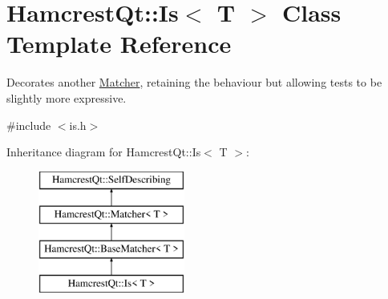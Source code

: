 \hypertarget{class_hamcrest_qt_1_1_is}{\section{Hamcrest\-Qt\-:\-:Is$<$ T $>$ Class Template Reference}
\label{class_hamcrest_qt_1_1_is}
}


Decorates another \hyperlink{class_hamcrest_qt_1_1_matcher}{Matcher}, retaining the behaviour but allowing tests to be slightly more expressive.  




{\ttfamily \#include $<$is.\-h$>$}

Inheritance diagram for Hamcrest\-Qt\-:\-:Is$<$ T $>$\-:\begin{figure}[H]
\begin{center}
\leavevmode
\includegraphics[height=4.000000cm]{class_hamcrest_qt_1_1_is}
\end{center}
\end{figure}
